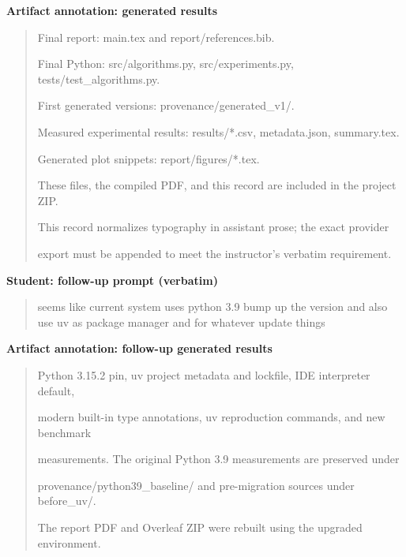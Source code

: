 \par\medskip\noindent\textbf{Artifact annotation: generated results}\par

\begin{quote}\small\raggedright

Final report: main.tex and report/references.bib.\par
Final Python: src/algorithms.py, src/experiments.py, tests/test\_algorithms.py.\par
First generated versions: provenance/generated\_v1/.\par
Measured experimental results: results/*.csv, metadata.json, summary.tex.\par
Generated plot snippets: report/figures/*.tex.\par
These files, the compiled PDF, and this record are included in the project ZIP.\par
This record normalizes typography in assistant prose; the exact provider\par
export must be appended to meet the instructor's verbatim requirement.\par

\end{quote}

\par\medskip\noindent\textbf{Student: follow-up prompt (verbatim)}\par

\begin{quote}\small\raggedright

seems like current system uses python 3.9 bump up the version and also use uv as package manager and for whatever update things\par

\end{quote}

\par\medskip\noindent\textbf{Artifact annotation: follow-up generated results}\par

\begin{quote}\small\raggedright

Python 3.15.2 pin, uv project metadata and lockfile, IDE interpreter default,\par
modern built-in type annotations, uv reproduction commands, and new benchmark\par
measurements. The original Python 3.9 measurements are preserved under\par
provenance/python39\_baseline/ and pre-migration sources under before\_uv/.\par
The report PDF and Overleaf ZIP were rebuilt using the upgraded environment.\par

\end{quote}

